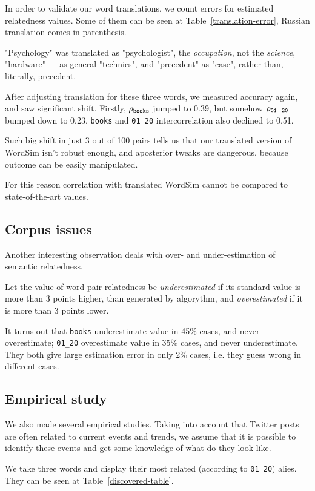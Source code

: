\documentclass[11pt,letterpaper]{article}
\begin{document}
In order to validate our word translations, we count errors for estimated
relatedness values. Some of them can be seen at Table~\ref{translation-error}, 
Russian translation comes in parenthesis.

"Psychology" was translated as "psychologist", the {\em occupation}, not the {\em science},
"hardware" --- as general "technics", and "precedent" as "case", rather than, 
literally, precedent.

After adjusting translation for these three words, we measured accuracy again, 
and saw significant shift. Firstly, $ \rho_{\tt books}$ jumped to 0.39, 
but somehow $ \rho_{\tt 01\_20} $ bumped down to 0.23. {\tt books} and {\tt 01\_20}
intercorrelation also declined to 0.51.

Such big shift in just 3 out of 100 pairs tells us that our translated version
of WordSim isn't robust enough, and aposterior tweaks are dangerous, because
outcome can be easily manipulated.

For this reason correlation with translated WordSim cannot be compared to
state-of-the-art values. 

\subsection{Corpus issues}

Another interesting observation deals with over- and under-estimation of 
semantic relatedness. 

Let the value of word pair relatedness be {\em underestimated} if its standard value is more than 
3 points higher, than generated by algorythm, and {\em overestimated} if it is more than 3 points  
lower.

It turns out that {\tt books} underestimate value in 45\% cases, and never overestimate;
{\tt 01\_20} overestimate value in 35\% cases, and never underestimate. 
They both give large estimation error in only 2\% cases, i.e. they guess wrong in different cases.

\subsection{Empirical study}

We also made several empirical studies. Taking into account that Twitter posts are often
related to current events and trends, we assume that it is possible to identify
these events and get some knowledge of what do they look like.

We take three words and display their most related (according to {\tt 01\_20}) alies.
They can be seen at Table~\ref{discovered-table}.
\end{document}
